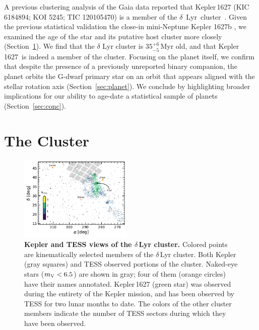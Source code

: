 \documentclass[12pt,modern,twocolumn,tighten]{aastex63}
\newcommand{\cn}{$\delta$\ Lyr\ cluster} %
\newcommand{\sn}{Kepler\,1627} %
\begin{document}
A previous clustering analysis of the Gaia data reported that
Kepler\,1627 (KIC 6184894; KOI 5245; TIC 120105470) is a member of the
\cn\ \citep{kounkel_untangling_2019}.  Given the previous statistical
validation the close-in mini-Neptune Kepler 1627b
\citep{2012ApJS..199...24T,morton_false_2016,thompson_planetary_2018},
we examined the age of the star and its putative host cluster more
closely (Section~\ref{sec:cluster}).  We find that the $\delta$ Lyr
cluster is $35^{+6}_{-5}$\,Myr old, and that \sn\ is indeed a member
of the cluster.  Focusing on the planet itself,
we confirm that despite the presence of a previously unreported binary companion,
the planet orbits the G-dwarf primary star on an orbit that appears aligned
with the stellar rotation axis
(Section~\ref{sec:planet}).  We conclude by
highlighting broader implications for our ability to age-date a
statistical sample of planets (Section~\ref{sec:conc}).


\section{The Cluster}
\label{sec:cluster}

\begin{figure}[t]
	\begin{center}
		\leavevmode
		\includegraphics[width=0.48\textwidth]{f2.pdf}
	\end{center}
	\vspace{-0.7cm}
	\caption{
    {\bf Kepler and TESS views of the $\delta$\,Lyr cluster.} Colored
    points are kinematically selected members of the $\delta$\,Lyr
    cluster.  Both Kepler (gray squares) and TESS observed portions of
    the cluster.  Naked-eye stars ($m_{\rm V}<6.5$) are shown in gray;
    four of them (orange circles) have their names annotated.
    Kepler\,1627 (green star) was observed during the entirety of the
    Kepler mission, and has been observed by TESS for two lunar months
    to date.  The colors of the other cluster members indicate the
    number of TESS sectors during which they have been observed.
    \label{fig:skychart}
	}
\end{figure}
\end{document}
